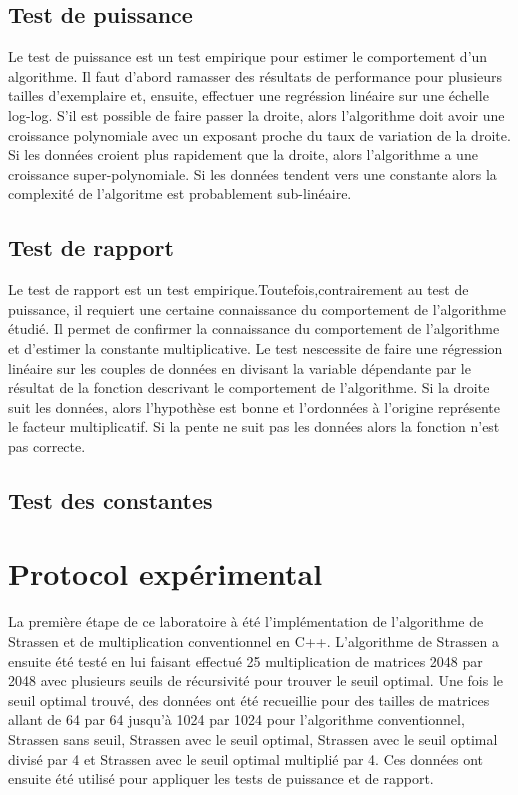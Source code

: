 \documentclass[a4paper, 12pt]{article} %
\begin{document}
\subsection{Test de puissance}
Le test de puissance est un test empirique pour estimer le comportement d'un algorithme. Il faut d'abord ramasser des résultats de performance pour plusieurs tailles d'exemplaire et, ensuite, effectuer
une regréssion linéaire sur une échelle log-log. S'il est possible de faire passer la droite, alors l'algorithme doit avoir une croissance polynomiale avec un exposant proche du taux de variation de la droite. Si les données croient plus rapidement que la droite, alors l'algorithme a une croissance super-polynomiale. Si les données tendent vers une constante alors la complexité de l'algoritme est probablement sub-linéaire.
\subsection{Test de rapport}
Le test de rapport est un test empirique.Toutefois,contrairement au test de puissance, il requiert une certaine connaissance du comportement de l'algorithme étudié. Il permet de confirmer la connaissance
du comportement de l'algorithme et d'estimer la constante multiplicative. Le test nescessite de faire une régression linéaire sur les couples de données en divisant la variable dépendante par le résultat
de la fonction descrivant le comportement de l'algorithme. Si la droite suit les données, alors l'hypothèse est bonne et l'ordonnées à l'origine représente le facteur multiplicatif. Si la pente ne suit pas les données alors la fonction n'est pas correcte.
\subsection{Test des constantes}

\section{Protocol expérimental}
La première étape de ce laboratoire à été l'implémentation de l'algorithme de Strassen et de multiplication conventionnel en C++. L'algorithme de Strassen a ensuite été testé en lui faisant effectué 25 multiplication de matrices 2048 par 2048 avec plusieurs seuils de récursivité pour trouver le seuil optimal. Une fois le seuil optimal trouvé, des données ont été recueillie pour des tailles de matrices allant de 64 par 64 jusqu'à 1024 par 1024 pour l'algorithme conventionnel, Strassen sans seuil, Strassen avec le seuil optimal, Strassen avec le seuil optimal divisé par 4 et Strassen avec le seuil optimal multiplié par 4. Ces données ont ensuite été utilisé pour appliquer les tests de puissance et de rapport.
\end{document}
